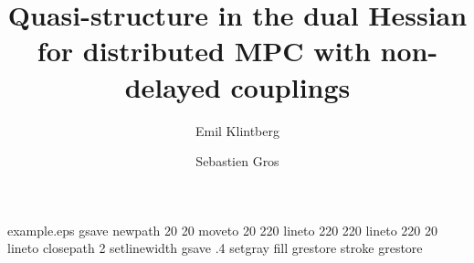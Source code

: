 %
%
%
%
%
\begin{filecontents*}{example.eps}
gsave
newpath
  20 20 moveto
  20 220 lineto
  220 220 lineto
  220 20 lineto
closepath
2 setlinewidth
gsave
  .4 setgray fill
grestore
stroke
grestore
\end{filecontents*}
%
\RequirePackage{fix-cm}
%
\documentclass[smallextended]{svjour3}       %
%
\smartqed  %
%
\usepackage{graphicx}
\usepackage{amsmath}              
  {
      \newtheorem{assumption}{Assumption}
  }
\usepackage{amssymb}
\usepackage{graphicx}
\usepackage{caption}
\usepackage{subcaption}
%
%
%
%
%


\title{Quasi-structure in the dual Hessian for distributed MPC with non-delayed couplings%
}


\author{Emil Klintberg         \and
        Sebastien Gros %
}

